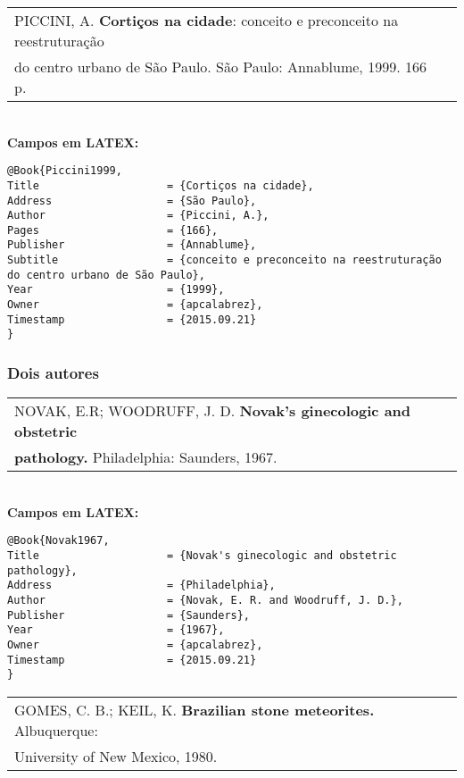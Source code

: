 \begin{tabular}{|l|c|} \hline
PICCINI, A. \textbf{Cortiços na cidade}: conceito e preconceito na reestruturação\\ do centro urbano de São Paulo. São Paulo: Annablume, 1999. 166 p. \\\hline
\end{tabular}\\

\textbf{Campos em LATEX:}

\begin{verbatim}
@Book{Piccini1999,
Title                    = {Cortiços na cidade},
Address                  = {São Paulo},
Author                   = {Piccini, A.},
Pages                    = {166},
Publisher                = {Annablume},
Subtitle                 = {conceito e preconceito na reestruturação
do centro urbano de São Paulo},
Year                     = {1999},
Owner                    = {apcalabrez},
Timestamp                = {2015.09.21}
}
\end{verbatim}

\subsubsection{Dois autores}

\begin{tabular}{|l|c|} \hline
NOVAK, E.R; WOODRUFF, J. D. \textbf{Novak's ginecologic and obstetric}\\ \textbf{pathology.} Philadelphia: Saunders, 1967. \\\hline
\end{tabular}\\

\textbf{Campos em LATEX:}
\begin{verbatim}
@Book{Novak1967,
Title                    = {Novak's ginecologic and obstetric 
pathology},
Address                  = {Philadelphia},
Author                   = {Novak, E. R. and Woodruff, J. D.},
Publisher                = {Saunders},
Year                     = {1967},
Owner                    = {apcalabrez},
Timestamp                = {2015.09.21}
}

\end{verbatim}

\begin{tabular}{|l|c|} \hline
	GOMES, C. B.; KEIL, K. \textbf{Brazilian stone meteorites.} 
	Albuquerque: \\ University of New Mexico, 1980. \\\hline
\end{tabular}\\

